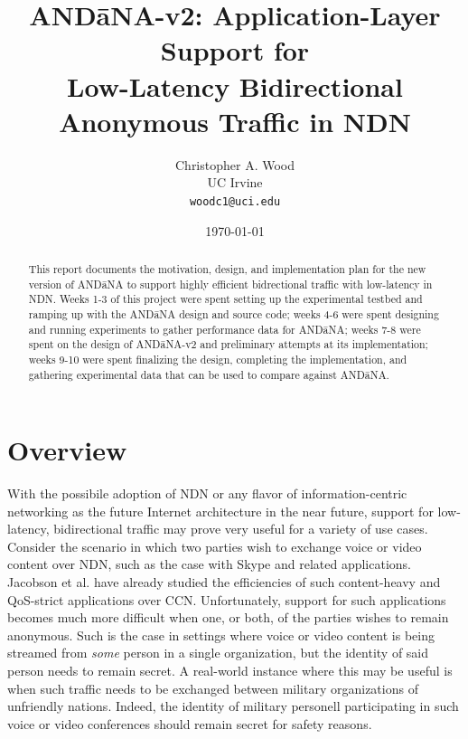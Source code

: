 \documentclass[10pt]{article}
\begin{document}
\title{{\sf AND\=aNA-v2}: Application-Layer Support for \\ Low-Latency Bidirectional Anonymous Traffic in NDN}
\author{Christopher A. Wood \\ UC Irvine \\ {\tt woodc1@uci.edu}}
\date{\today}
\maketitle

\begin{abstract}
This report documents the motivation, design, and implementation plan for the new version of {\sf AND\=aNA} to support highly efficient bidrectional traffic with low-latency in NDN. Weeks 1-3 of this project were spent setting up the experimental testbed and ramping up with the {\sf AND\=aNA} design and source code; weeks 4-6 were spent designing and running experiments to gather performance data for {\sf AND\=aNA}; weeks 7-8 were spent on the design of {\sf AND\=aNA-v2} and preliminary attempts at its implementation; weeks 9-10 were spent finalizing the design, completing the implementation, and gathering experimental data that can be used to compare against {\sf AND\=aNA}.
\end{abstract}


\section{Overview} \label{sec:overview}
With the possibile adoption of NDN or any flavor of information-centric networking as the future Internet architecture in the near future, support for low-latency, bidirectional traffic may prove very useful for a variety of use cases. Consider the scenario in which two parties wish to exchange voice or video content over NDN, such as the case with Skype and related applications. Jacobson et al. \cite{voccn} have already studied the efficiencies of such content-heavy and QoS-strict applications over CCN. Unfortunately, support for such applications becomes much more difficult when one, or both, of the parties wishes to remain anonymous. Such is the case in settings where voice or video content is being streamed from \emph{some} person in a single organization, but the identity of said person needs to remain secret. A real-world instance where this may be useful is when such traffic needs to be exchanged between military organizations of unfriendly nations. Indeed, the identity of military personell participating in such voice or video conferences should remain secret for safety reasons. 
\end{document}
